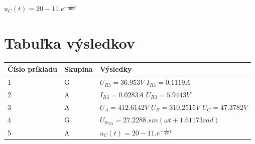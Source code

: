 \documentclass[10pt,a4paper]{article}
\begin{document}
	$u_{C}(t) = 20 - 11.e^{-\frac{1}{400}t}$
	
	
	

\newpage
 \section {Tabuľka výsledkov}
 \begin{center}
 \renewcommand{\arraystretch}{2}
    \begin{tabular}{ | l | l | l |  }
    \hline
    Číslo príkladu & Skupina &  Výsledky \\ \hline
    1 & G & $U_{R3}=36.953V$ 
    $I_{R3}=0.1119A$ \\ \hline
    2 & A & $ I_{R3} = 0.0283 A$ $U_{R3}=5.9443 V$ \\ \hline
    3 & A & $ U_{A}=412.6142 V $
    $ U_{B}= 310.2515 V $    
    $ U_{C}= 47.3782 V $ \\ \hline
    4 & G & $U_{m_{C2}}=27.2288.sin(\omega t+1.61173 rad)$ \\ \hline
    5 & A & $u_{C}(t) = 20 - 11.e^{-\frac{1}{400}t}$ \\ \hline
    \end{tabular}
\end{center} 
 
\end{document}
